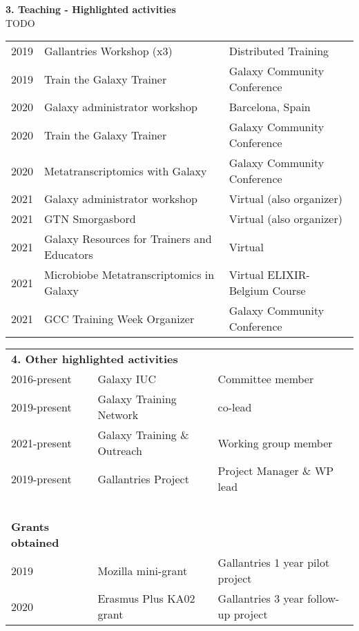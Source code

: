\begin{table}[h!]
    \textbf{3. Teaching - Highlighted activities} \\


	TODO
    \begin{tabular}{lll}
        2019 & Gallantries Workshop (x3)                       & Distributed Training \\
        2019 & Train the Galaxy Trainer                        & Galaxy Community Conference \\
        2020 & Galaxy administrator workshop                   & Barcelona, Spain \\
        2020 & Train the Galaxy Trainer                        & Galaxy Community Conference \\
        2020 & Metatranscriptomics with Galaxy                 & Galaxy Community Conference \\
        2021 & Galaxy administrator workshop                   & Virtual (also organizer) \\
        2021 & GTN Smorgasbord                                 & Virtual (also organizer) \\
        2021 & Galaxy Resources for Trainers and Educators     & Virtual  \\
        2021 & Microbiobe Metatranscriptomics in Galaxy        & Virtual ELIXIR-Belgium Course \\
        2021 & GCC Training Week Organizer                     & Galaxy Community Conference \\
    \end{tabular}
\end{table}

\begin{table}
    \begin{tabular}{lll}

        \multicolumn{3}{l}{\textbf{4.  Other highlighted activities}} \\
        2016-present & Galaxy IUC & Committee member \\
        2019-present & Galaxy Training Network & co-lead  \\
        2021-present & Galaxy Training \& Outreach& Working group member \\
        2019-present & Gallantries Project & Project Manager \& WP lead \\
        \ \\
        \textbf{Grants obtained} \\
         2019 & Mozilla mini-grant& Gallantries 1 year pilot project  \\
         2020 & Erasmus Plus KA02 grant & Gallantries 3 year follow-up project \\
    \end{tabular}
\end{table}



\normalsize
